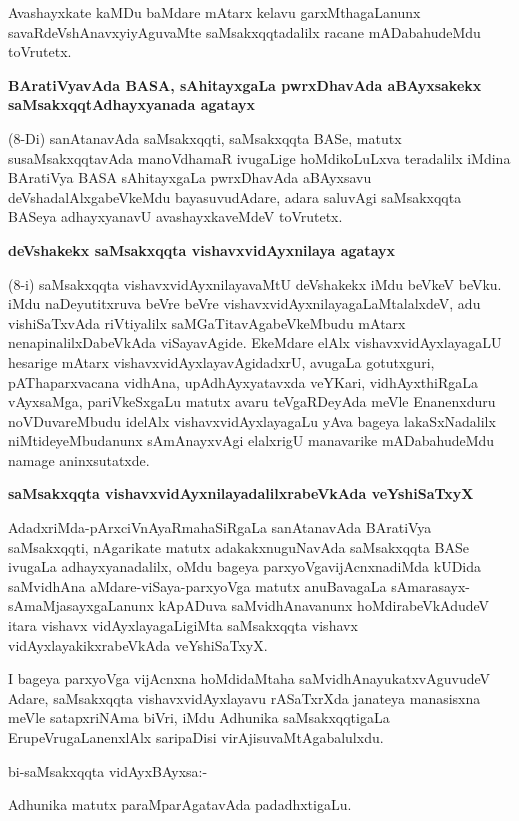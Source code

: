 Avashayxkate kaMDu baMdare mAtarx kelavu garxMthagaLanunx savaRdeVshAnavxyiyAgu\-vaMte saMsakxqqtadalilx racane mADabahudeMdu toVrutetx.

{\bigskip
\noindent
{\large\bf BAratiVyavAda BASA, sAhitayxgaLa pwrxDhavAda aBAyxsakekx saMsakxqqtAdhayxyanada agatayx}}\label{page37}
\medskip

\noindent
(8-Di) sanAtanavAda saMsakxqqti, saMsakxqqta BASe, matutx susaMsakxqqtavAda manoV\-dhamaR ivu\-ga\-Lige hoMdi\-koLuLxva teradalilx iMdina BAratiVya BASA sAhitayxgaLa pwrxDhavAda aBAyxsavu deVshadalAlxgabeV\-keMdu bayasuvudAdare, adara saluvAgi saMsakxqqta BASeya adhayxyanavU avashayxkaveMdeV toVrutetx.

{\bigskip
\noindent
{\large\bf deVshakekx saMsakxqqta vishavxvidAyxnilaya agatayx}}\label{page37}
\medskip

\noindent
(8-i) saMsakxqqta vishavxvidAyxnilayavaMtU deVshakekx iMdu beVkeV beVku. iMdu naDeyutitxruva beVre beVre vishavxvidAyxnilayagaLaMtalalxdeV, adu vishiSaTxvAda riVtiyalilx saMGaTitavAgabeVkeMbudu mAtarx nenapi\-nalilxDa\-beVkAda viSayavAgide. EkeMdare elAlx vishavxvidAyxlayagaLU hesarige mAtarx vishavxvidAyxlayavAgi\-dadxrU, avugaLa gotutxguri, pAThaparxvacana vidhAna, upAdhAyxyatavxda veYKari, vidhAyxthiRgaLa vAyxsaMga, pariVkeSxgaLu matutx avaru teVgaRDeyAda meVle Enanenxduru noVDuvareMbudu idelAlx vishavxvidAyxlaya\-gaLu yAva bageya lakaSxNadalilx niMtideyeMbudanunx sAmAnayxvAgi elalxrigU manavarike mADa\-bahu\-deMdu namage aninxsutatxde.

{\bigskip
\noindent
{\large\bf saMsakxqqta vishavxvidAyxnilayadalilxrabeVkAda veYshiSaTxyX}}\label{page37}
\medskip

\noindent
AdadxriMda-pArxciVnAyaRmahaSiRgaLa sanAtanavAda BAratiVya saMsakxqqti, nAgari\-kate matutx adakakx\-nuguNa\-vAda saMsakxqqta BASe ivugaLa adhayxyanadalilx, oMdu bageya parxyoVgavijAcnxnadiMda kUDida saMvi\-dhAna aMdare-viSaya-parxyoVga matutx anu\-BavagaLa sAmarasayx-sAmaMjasayxgaLanunx kApADuva saMvi\-dhAna\-vanunx hoMdira\-beVkAdudeV itara vishavx vidAyxlayagaLigiMta saMsakxqqta vishavx vidAyxlayakikxrabeVkAda veYshiSaTxyX.

I bageya parxyoVga vijAcnxna hoMdidaMtaha saMvidhAnayukatxvAguvudeV Adare, saMsakxqqta vishavx\-vidAyxlayavu rASaTxrXda janateya manasisxna meVle satapxriNAma biVri, iMdu Adhunika saMsakxqqtigaLa ErupeVru\-gaLanenxlAlx saripaDisi virAjisu\-vaMtAgabalulxdu.
\medskip

\noindent
bi-saMsakxqqta vidAyxBAyxsa:-

Adhunika matutx paraMparAgatavAda padadhxtigaLu.

